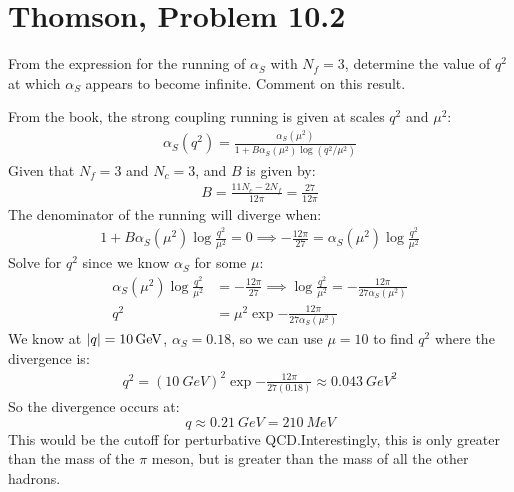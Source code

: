 \documentclass[12pt]{article}
\begin{document}
\section{Thomson, Problem 10.2}
\begin{problem}
  From the expression for the running of $\alpha_S$ with $N_f=3$, determine the value of $q^2$ at which $\alpha_S$ appears to become infinite. Comment on this result.
\end{problem}
From the book, the strong coupling running is given at scales $q^2$ and $\mu^2$:
\begin{align*}
  \alpha_S(q^2)=\frac{\alpha_S(\mu^2)}{1+B\alpha_S(\mu^2)\log(q^2/\mu^2)}
\end{align*}
Given that $N_f=3$ and $N_c=3$, and $B$ is given by:
\begin{align*}
  B=\frac{11N_c-2N_f}{12\pi}=\frac{27}{12\pi}
\end{align*}
The denominator of the running will diverge when:
\begin{align*}
  1+B\alpha_S(\mu^2)\log\frac{q^2}{\mu^2}=0
  \implies-\frac{12\pi}{27}=\alpha_S(\mu^2)\log\frac{q^2}{\mu^2}
\end{align*}
Solve for $q^2$ since we know $\alpha_S$ for some $\mu$:
\begin{align*}
  \alpha_S(\mu^2)\log\frac{q^2}{\mu^2}&=-\frac{12\pi}{27}\implies
  \log\frac{q^2}{\mu^2}=-\frac{12\pi}{27\alpha_S(\mu^2)}\\
  q^2&=\mu^2\exp{-\frac{12\pi}{27\alpha_S(\mu^2)}}
\end{align*}
We know at $\abs{q}=\SI{10}{GeV}$, $\alpha_S=0.18$, so we can use $\mu=10$ to find $q^2$ where the divergence is:
\begin{align*}
  q^2={(\SI{10}{GeV})}^2\exp{-\frac{12\pi}{27(0.18)}}\approx\SI{0.043}{GeV^2}
\end{align*}
So the divergence occurs at:
\begin{equation}
  \label{eq:p7}
  \boxed{q\approx\SI{0.21}{GeV}=\SI{210}{MeV}}
\end{equation}
This would be the cutoff for perturbative QCD.\@ Interestingly, this is only greater than the mass of the $\pi$ meson, but is greater than the mass of all the other hadrons.
\newpage
\end{document}
